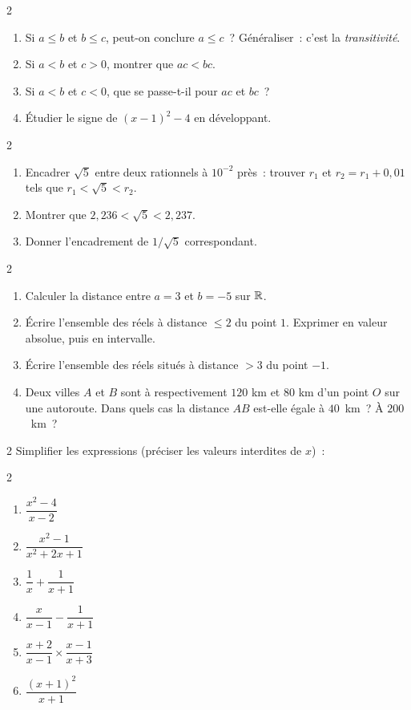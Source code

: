 \begin{exo}{2}
\begin{enumerate}
  \item Si $a \leq b$ et $b \leq c$, peut-on conclure $a \leq c$~?
        G\'en\'eraliser~: c'est la \emph{transitivit\'e}.
  \item Si $a < b$ et $c > 0$, montrer que $ac < bc$.
  \item Si $a < b$ et $c < 0$, que se passe-t-il pour $ac$ et $bc$~?
  \item \'Etudier le signe de $(x-1)^2 - 4$ en d\'eveloppant.
\end{enumerate}
\end{exo}

\begin{exo}{2}
\begin{enumerate}
  \item Encadrer $\sqrt{5}$ entre deux rationnels \`a $10^{-2}$ pr\`es~:
        trouver $r_1$ et $r_2 = r_1 + 0{,}01$ tels que $r_1 < \sqrt{5} < r_2$.
  \item Montrer que $2{,}236 < \sqrt{5} < 2{,}237$.
  \item Donner l'encadrement de $1/\sqrt{5}$ correspondant.
\end{enumerate}
\end{exo}

\begin{exo}{2}
\begin{enumerate}
  \item Calculer la distance entre $a=3$ et $b=-5$ sur $\mathbb{R}$.
  \item \'Ecrire l'ensemble des r\'eels \`a distance $\leq 2$ du point $1$.
        Exprimer en valeur absolue, puis en intervalle.
  \item \'Ecrire l'ensemble des r\'eels situ\'es \`a distance $>3$ du point $-1$.
  \item Deux villes $A$ et $B$ sont \`a respectivement $120$ km et $80$ km
        d'un point $O$ sur une autoroute.
        Dans quels cas la distance $AB$ est-elle \'egale \`a $40$~km~?
        \`A $200$~km~?
\end{enumerate}
\end{exo}

\begin{exo}{2}
Simplifier les expressions (pr\'eciser les valeurs interdites de $x$)~:
\begin{multicols}{2}
\begin{enumerate}
  \item $\dfrac{x^2-4}{x-2}$
  \item $\dfrac{x^2-1}{x^2+2x+1}$
  \item $\dfrac{1}{x} + \dfrac{1}{x+1}$
  \item $\dfrac{x}{x-1} - \dfrac{1}{x+1}$
  \item $\dfrac{x+2}{x-1} \times \dfrac{x-1}{x+3}$
  \item $\dfrac{(x+1)^2}{x+1}$
\end{enumerate}
\end{multicols}
\end{exo}

